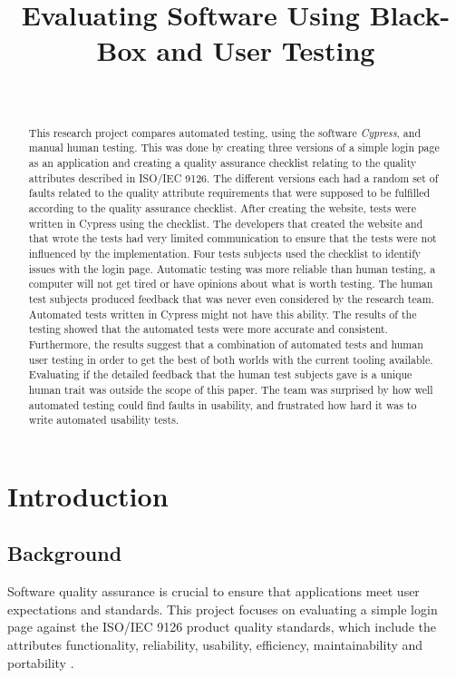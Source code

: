 \documentclass[journal,twocolumn]{IEEEtran}
\title{Evaluating Software Using Black-Box and User Testing}
\author{\IEEEauthorblockN{Oliver Levay, Kristina Sedelius, Adam Tegelberg, Emma Haggren}
\\
\IEEEauthorblockA{\textit{Lunds tekniska högskola} \\
\textit{Lund University}\\
Lund, Sweden \\
(ol1662le-s, kr0363se-s, ad3444te-s, em5261ha-s)@student.lu.se}
}
\begin{document}
\maketitle
\IEEEpeerreviewmaketitle

\begin{abstract}
    This research project compares automated testing, using the software \textit{Cypress}, and manual human testing. This was done by creating three versions of a simple login page as an application and creating a quality assurance checklist relating to the quality attributes described in ISO/IEC 9126. The different versions each had a random set of faults related to the quality attribute requirements that were supposed to be fulfilled according to the quality assurance checklist. After creating the website, tests were written in Cypress using the checklist. The developers that created the website and that wrote the tests had very limited communication to ensure that the tests were not influenced by the implementation. Four tests subjects used the checklist to identify issues with the login page. Automatic testing was more reliable than human testing, a computer will not get tired or have opinions about what is worth testing. The human test subjects produced feedback that was never even considered by the research team. Automated tests written in Cypress might not have this ability. The results of the testing showed that the automated tests were more accurate and consistent. Furthermore, the results suggest that a combination of automated tests and human user testing in order to get the best of both worlds with the current tooling available. Evaluating if the detailed feedback that the human test subjects gave is a unique human trait was outside the scope of this paper. The team was surprised by how well automated testing could find faults in usability, and frustrated how hard it was to write automated usability tests.
\end{abstract}

\section{Introduction}
\subsection{Background}
Software quality assurance is crucial to ensure that applications meet user expectations and standards. This project focuses on evaluating a simple login page against the ISO/IEC 9126 product quality standards, which include the attributes functionality, reliability, usability, efficiency, maintainability and portability \cite{ISO}.
\end{document}
